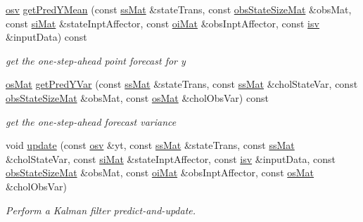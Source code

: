 \begin{DoxyCompactItemize}
\hyperlink{classcf__filter_a91d9961b2ecd202b1400c401434b392d}{osv} \hyperlink{classkalman_a9578d69543a3e756275e61a69ad9f1ac}{get\+Pred\+Y\+Mean} (const \hyperlink{classkalman_a581550d9aba33245fb496b22a834831c}{ss\+Mat} \&state\+Trans, const \hyperlink{classkalman_a13c0f71cc509326e1493982e9f23ebfc}{obs\+State\+Size\+Mat} \&obs\+Mat, const \hyperlink{classkalman_ab024c795f585385ee14aea92a5dccfbc}{si\+Mat} \&state\+Inpt\+Affector, const \hyperlink{classkalman_a35298f18f0b699f700e2d55d94bf54fc}{oi\+Mat} \&obs\+Inpt\+Affector, const \hyperlink{classkalman_abc570ce1b06e8a96a334f9226dfbce77}{isv} \&input\+Data) const
\begin{DoxyCompactList}\small\item\em get the one-\/step-\/ahead point forecast for y \end{DoxyCompactList}\item 
\hyperlink{classkalman_a28ffd71604fac7b25492b1b43379e046}{os\+Mat} \hyperlink{classkalman_a029d34d75a517bc82d097bb9e289497f}{get\+Pred\+Y\+Var} (const \hyperlink{classkalman_a581550d9aba33245fb496b22a834831c}{ss\+Mat} \&state\+Trans, const \hyperlink{classkalman_a581550d9aba33245fb496b22a834831c}{ss\+Mat} \&chol\+State\+Var, const \hyperlink{classkalman_a13c0f71cc509326e1493982e9f23ebfc}{obs\+State\+Size\+Mat} \&obs\+Mat, const \hyperlink{classkalman_a28ffd71604fac7b25492b1b43379e046}{os\+Mat} \&chol\+Obs\+Var) const
\begin{DoxyCompactList}\small\item\em get the one-\/step-\/ahead forecast variance \end{DoxyCompactList}\item 
void \hyperlink{classkalman_af6da5b13d55eee01cd609c1bc694b3ef}{update} (const \hyperlink{classcf__filter_a91d9961b2ecd202b1400c401434b392d}{osv} \&yt, const \hyperlink{classkalman_a581550d9aba33245fb496b22a834831c}{ss\+Mat} \&state\+Trans, const \hyperlink{classkalman_a581550d9aba33245fb496b22a834831c}{ss\+Mat} \&chol\+State\+Var, const \hyperlink{classkalman_ab024c795f585385ee14aea92a5dccfbc}{si\+Mat} \&state\+Inpt\+Affector, const \hyperlink{classkalman_abc570ce1b06e8a96a334f9226dfbce77}{isv} \&input\+Data, const \hyperlink{classkalman_a13c0f71cc509326e1493982e9f23ebfc}{obs\+State\+Size\+Mat} \&obs\+Mat, const \hyperlink{classkalman_a35298f18f0b699f700e2d55d94bf54fc}{oi\+Mat} \&obs\+Inpt\+Affector, const \hyperlink{classkalman_a28ffd71604fac7b25492b1b43379e046}{os\+Mat} \&chol\+Obs\+Var)
\begin{DoxyCompactList}\small\item\em Perform a Kalman filter predict-\/and-\/update. \end{DoxyCompactList}\end{DoxyCompactItemize}
